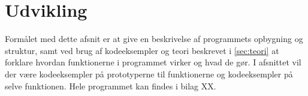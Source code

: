 \section{Udvikling}
Formålet med dette afsnit er at give en beskrivelse af programmets opbygning og struktur, samt ved brug af kodeeksempler og teori beskrevet i \ref{sec:teori} at forklare hvordan funktionerne i programmet virker og hvad de gør. I afsnittet vil der være kodeeksempler på prototyperne til funktionerne og kodeeksempler på selve funktionen. Hele programmet kan findes i bilag XX.




























